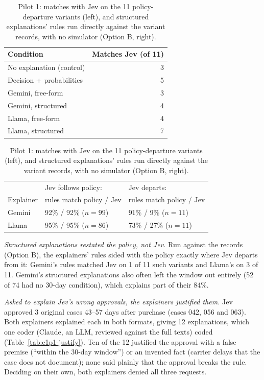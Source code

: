 \documentclass[11pt]{article}
\renewcommand{\_}{\origunderscore\allowbreak}
\begin{document}
\begin{table}[H]
\centering
\small
\caption{Pilot 1: matches with Jev on the 11 policy-departure variants (left), and structured explanations' rules run directly against the variant records, with no simulator (Option B, right).}
\label{tab:e1p1-departures}
\begin{tabular}{lr}
\toprule
Condition & Matches Jev (of 11) \\
\midrule
No explanation (control) & 3 \\
Decision + probabilities & 5 \\
Gemini, free-form & 3 \\
Gemini, structured & 4 \\
Llama, free-form & 4 \\
Llama, structured & 7 \\
\bottomrule
\end{tabular}
\hspace{1.5em}
\begin{tabular}{lll}
\toprule
 & Jev follows policy: & Jev departs: \\
Explainer & rules match policy / Jev & rules match policy / Jev \\
\midrule
Gemini & 92\% / 92\% ($n=99$) & 91\% / 9\% ($n=11$) \\
Llama & 95\% / 95\% ($n=86$) & 73\% / 27\% ($n=11$) \\
\bottomrule
\end{tabular}
\end{table}

\emph{Structured explanations restated the policy, not Jev.} Run against the records (Option B), the explainers' rules sided with the policy exactly where Jev departs from it: Gemini's rules matched Jev on 1 of 11 such variants and Llama's on 3 of 11. Gemini's structured explanations also often left the window out entirely (52 of 74 had no 30-day condition), which explains part of their 84\%.

\emph{Asked to explain Jev's wrong approvals, the explainers justified them.} Jev approved 3 original cases 43--57 days after purchase (cases 042, 056 and 063). Both explainers explained each in both formats, giving 12 explanations, which one coder (Claude, an LLM, reviewed against the full texts) coded (Table~\ref{tab:e1p1-justify}). Ten of the 12 justified the approval with a false premise (``within the 30-day window'') or an invented fact (carrier delays that the case does not document); none said plainly that the approval breaks the rule. Deciding on their own, both explainers denied all three requests.
\end{document}
